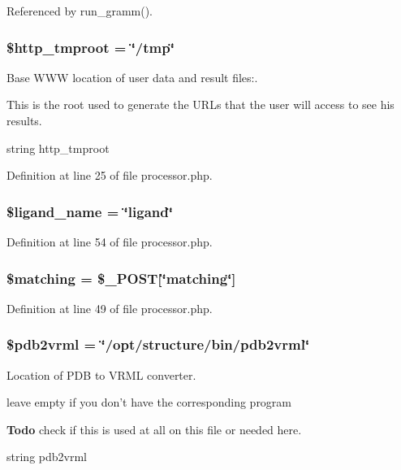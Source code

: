 Referenced by run\_\-gramm().
\subsubsection{\setlength{\rightskip}{0pt plus 5cm}\$http\_\-tmproot = \char`\"{}/tmp\char`\"{}}\label{processor_8php_a1}


Base WWW location of user data and result files:. 

This is the root used to generate the URLs that the user will access to see his results.

string http\_\-tmproot 

Definition at line 25 of file processor.php.
\subsubsection{\setlength{\rightskip}{0pt plus 5cm}\$ligand\_\-name = \char`\"{}ligand\char`\"{}}\label{processor_8php_a8}




Definition at line 54 of file processor.php.
\subsubsection{\setlength{\rightskip}{0pt plus 5cm}\$matching = \$\_\-POST[\char`\"{}matching\char`\"{}]}\label{processor_8php_a4}




Definition at line 49 of file processor.php.
\subsubsection{\setlength{\rightskip}{0pt plus 5cm}\$pdb2vrml = \char`\"{}/opt/structure/bin/pdb2vrml\char`\"{}}\label{processor_8php_a3}


Location of PDB to VRML converter. 

leave empty if you don't have the corresponding program

\begin{Desc}
\item[{\bf Todo}]check if this is used at all on this file or needed here. \end{Desc}
string pdb2vrml 

